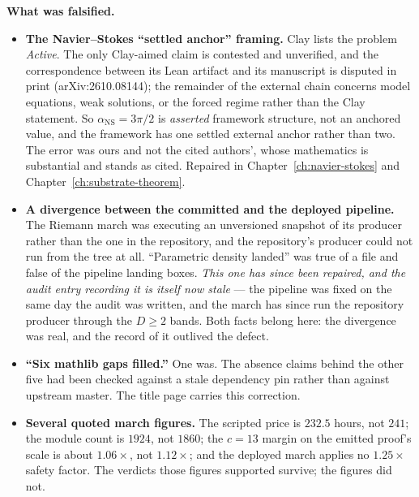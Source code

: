 \noindent\textbf{What was falsified.}
\begin{itemize}
\item \textbf{The Navier--Stokes ``settled anchor'' framing.} Clay lists the
problem \emph{Active}. The only Clay-aimed claim is contested and unverified,
and the correspondence between its Lean artifact and its manuscript is disputed
in print (arXiv:2610.08144); the remainder of the external chain concerns model
equations, weak solutions, or the forced regime rather than the Clay statement.
So $\alpha_{\text{NS}} = 3\pi/2$ is \emph{asserted} framework structure, not an
anchored value, and the framework has one settled external anchor rather than
two. The error was ours and not the cited authors', whose mathematics is
substantial and stands as cited. Repaired in
Chapter~\ref{ch:navier-stokes} and Chapter~\ref{ch:substrate-theorem}.
\item \textbf{A divergence between the committed and the deployed pipeline.}
The Riemann march was executing an unversioned snapshot of its producer rather
than the one in the repository, and the repository's producer could not run from
the tree at all. ``Parametric density landed'' was true of a file and false of
the pipeline landing boxes. \emph{This one has since been repaired, and the
audit entry recording it is itself now stale} --- the pipeline was fixed on the
same day the audit was written, and the march has since run the repository
producer through the $D \ge 2$ bands. Both facts belong here: the divergence was
real, and the record of it outlived the defect.
\item \textbf{``Six mathlib gaps filled.''} One was. The absence claims behind
the other five had been checked against a stale dependency pin rather than
against upstream master. The title page carries this correction.
\item \textbf{Several quoted march figures.} The scripted price is $232.5$
hours, not $241$; the module count is $1924$, not $1860$; the $c = 13$ margin on
the emitted proof's scale is about $1.06\times$, not $1.12\times$; and the
deployed march applies no $1.25\times$ safety factor. The verdicts those figures
supported survive; the figures did not.
\end{itemize}

